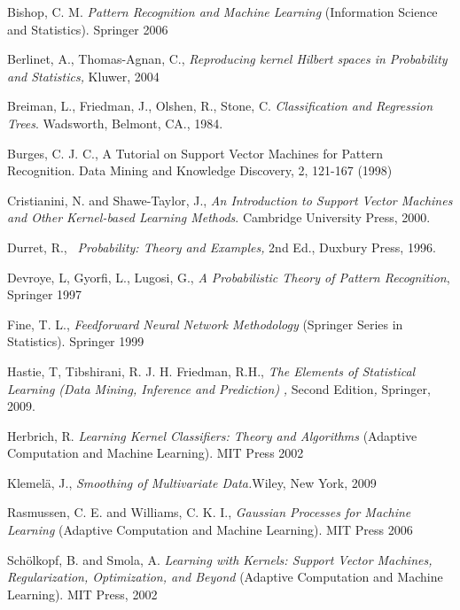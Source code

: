 \documentclass[11pt,twoside]{article}%
\theoremstyle{change}
\begin{document}
\begin{thebibliography}{9999}                                                                                             %
Bishop, C. M. \textsl{Pattern Recognition and Machine
Learning} (Information Science and Statistics). Springer 2006

Berlinet, A., Thomas-Agnan, C., \textsl{Reproducing kernel
Hilbert spaces in Probability and Statistics,} Kluwer, 2004

Breiman, L., Friedman, J., Olshen, R., Stone, C.
\textsl{Classification and Regression Trees}. Wadsworth, Belmont, CA., 1984.

Burges, C. J. C., A Tutorial on Support Vector Machines
for Pattern Recognition. Data Mining and Knowledge Discovery, 2, 121-167 (1998)

Cristianini, N. and Shawe-Taylor, J., \textsl{An
Introduction to Support Vector Machines and Other Kernel-based Learning
Methods}. Cambridge University Press, 2000.

Durret, R., \textsl{\ Probability: Theory and Examples, } 2nd
Ed., Duxbury Press, 1996.

Devroye, L, Gyorfi, L., Lugosi, G., \textsl{A Probabilistic
Theory of Pattern Recognition}, Springer 1997

Fine, T. L., \textsl{Feedforward Neural Network
Methodology} (Springer Series in Statistics). Springer 1999

Hastie, T, Tibshirani, R. J. H. Friedman, R.H., \textsl{The
Elements of Statistical Learning (Data Mining, Inference and Prediction)}%
\textit{, }Second Edition\textit{, }Springer, 2009.

Herbrich, R. \textsl{Learning Kernel Classifiers: Theory
and Algorithms} (Adaptive Computation and Machine Learning). MIT Press 2002

Klemel\"{a}, J., \textsl{Smoothing of Multivariate
Data.}Wiley, New York, 2009

Rasmussen, C. E. and Williams, C. K. I., \textsl{Gaussian
Processes for Machine Learning} (Adaptive Computation and Machine Learning).
MIT Press 2006

Sch\"{o}lkopf, B. and Smola, A. \textsl{Learning with
Kernels: Support Vector Machines, Regularization, Optimization, and Beyond}
(Adaptive Computation and Machine Learning). MIT Press, 2002


\end{thebibliography}
\end{document}
